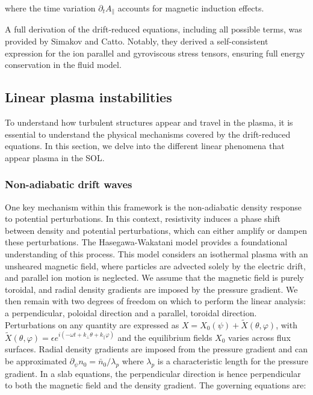 where the time variation $\partial_t A_\parallel$ accounts for magnetic induction effects. \newline

A full derivation of the drift-reduced equations, including all possible terms, was provided by Simakov and Catto\cite{simakov_2003}. Notably, they derived a self-consistent expression for the ion parallel and gyroviscous stress tensors, ensuring full energy conservation in the fluid model.




\subsection{Linear plasma instabilities}
\label{ssec:edge_linearDriftWaves}

To understand how turbulent structures appear and travel in the plasma, it is essential to understand the physical mechanisms covered by the drift-reduced equations. In this section, we delve into the different linear phenomena that appear plasma in the SOL.



\subsubsection{Non-adiabatic drift waves}
\label{ssec:edge_nonAdiabaticResponse}
One key mechanism within this framework is the non-adiabatic density response to potential perturbations. In this context, resistivity induces a phase shift between density and potential perturbations, which can either amplify or dampen these perturbations. The Hasegawa-Wakatani model\cite{hasegawa1983plasma} provides a foundational understanding of this process. This model considers an isothermal plasma with an unsheared magnetic field, where particles are advected solely by the electric drift, and parallel ion motion is neglected. We assume that the magnetic field is purely toroidal, and radial density gradients are imposed by the pressure gradient. We then remain with two degrees of freedom on which to perform the linear analysis: a perpendicular, poloidal direction and a parallel, toroidal direction. Perturbations on any quantity are expressed as $ X = X_0(\psi) + \tilde{X}(\theta,\varphi) $, with $\tilde{X}(\theta,\varphi) = \epsilon e^{i(-\omega t + k_\perp\theta+k_\parallel\varphi )}$ and the equilibrium fields $ X_0 $ varies across flux surfaces. Radial density gradients are imposed from the pressure gradient and can be approximated $\partial_\psi n_0 = \bar{n}_0 / \lambda_p$ where $\lambda_p$ is a characteristic length for the pressure gradient. In a slab equations, the perpendicular direction is hence perpendicular to both the magnetic field and the density gradient. The governing equations are:

